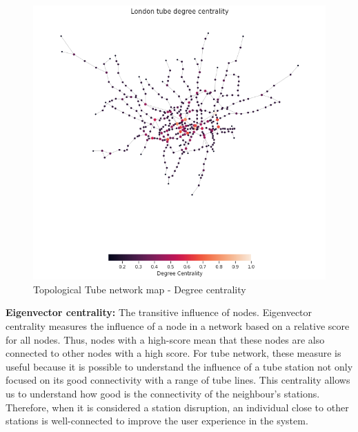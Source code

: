 \documentclass[10pt]{report}
\numberwithin{figure}{section}
\numberwithin{table}{section}
\begin{document}
    \begin{figure}[htp]
        \centering
        \includegraphics[width=14cm]{Image/Part1_topologicalmap_degree.png}
        \caption{Topological Tube network map - Degree centrality}
        \label{fig:galaxy}
    \end{figure}   


        
  \vspace{5mm} %
        
        \textbf{Eigenvector centrality:}  The transitive influence of nodes. Eigenvector centrality measures the influence of a node in a network based on a relative score for all nodes. Thus, nodes with a high-score mean that these nodes are also connected to other nodes with a high score. For tube network, these measure is useful because it is possible to understand the influence of a tube station not only focused on its good connectivity with a  range of tube lines. This centrality allows us to understand how good is the connectivity of the neighbour's stations. Therefore, when it is considered a station disruption, an individual close to other stations is well-connected to improve the user experience in the system. 
\end{document}
